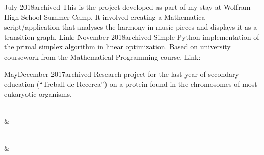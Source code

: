 \documentclass[a4paper, 11pt]{article}
\begin{document}
\begin{longtabu}
                  {}
                  {July 2018}{}{archived}
                  {This is the project developed as part of my stay at Wolfram High School Summer Camp. It involved creating a Mathematica script/application that analyses the harmony in music pieces and displays it as a transition graph.
                  Link: }
      \smallskip
      {}
      {November 2018}{}{archived}
      {Simple Python implementation of the primal simplex algorithm in linear optimization. Based on university coursework from the Mathematical Programming course. Link: }
      
      \smallskip
      {}
      {May}{December 2017}{archived}
      {Research project for the last year of secondary education (“Treball de Recerca”) on a protein found in the chromosomes of most eukaryotic organisms.}
     
     \\
     
      &
     \cvsectionrule
     
     \\
     
      &
     \cvsectionrule
    
\end{longtabu}
\end{document}
